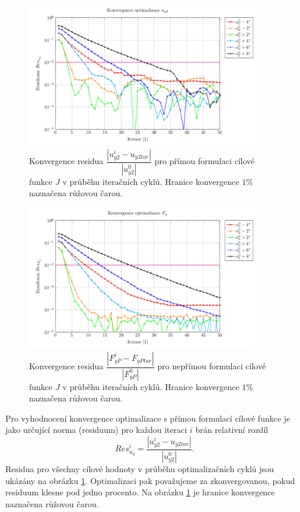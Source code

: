 \begin{figure}
	\includegraphics[width=0.9\textwidth]{img/Uy.pdf}
	\caption{Konvergence residua $ \dfrac{|u_{y2}^i-u_{y2tar}|}{|u_{y2}^0|} $ pro přímou formulaci cílové funkce $ J $ v průběhu iteračních cyklů. Hranice konvergence $ 1\% $ naznačena růžovou čarou.}
	\label{fig:ghs1_Uy}
\end{figure}

\begin{figure}
	\includegraphics[width=0.9\textwidth]{img/Fy.pdf}
	\caption{Konvergence residua $ \dfrac{|F_{yP}^i-F_{yPtar}|}{|F_{yP}^0|} $ pro nepřímou formulaci cílové funkce $ J $ v průběhu iteračních cyklů. Hranice konvergence $ 1\% $ naznačena růžovou čarou.}
	\label{fig:ghs1_Fy}
\end{figure}

Pro vyhodnocení konvergence optimalizace s přímou formulací cílové funkce je jako určující norma (residuum) pro každou iteraci $ i $ brán relativní rozdíl
\begin{equation}\label{eq:res_uy}
Res_{u_{y}}^i=\dfrac{|u_{y2}^i-u_{y2tar}|}{|u_{y2}^0|}.
\end{equation}
Residua pro všechny cílové hodnoty v průběhu optimalizačních cyklů jsou ukázány na obrázku \ref{fig:ghs1_Uy}.
Optimalizaci pak považujeme za zkonvergovanou, pokud residuum klesne pod jedno procento. Na obrázku \ref{fig:ghs1_Uy} je hranice konvergence naznačena růžovou čarou.

